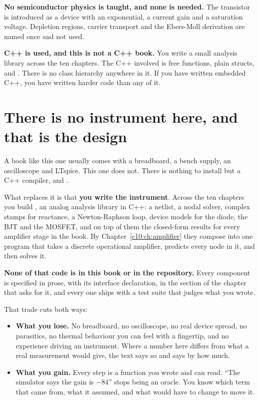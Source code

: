 \textbf{No semiconductor physics is taught, and none is needed.} The transistor is introduced as a
device with an exponential, a current gain and a saturation voltage. Depletion regions, carrier
transport and the Ebers-Moll derivation are named once and not used.

\textbf{C++ is used, and this is not a C++ book.} You write a small analysis library across the
ten chapters. The C++ involved is free functions, plain structs,  and
. There is no class hierarchy anywhere in it. If you have written embedded
C++, you have written harder code than any of it.

\section*{There is no instrument here, and that is the design}
\label{pre:sec:instrument}
A book like this one usually comes with a breadboard, a bench supply, an oscilloscope and LTspice.
This one does not. There is nothing to install but a C++ compiler,  and .

What replaces it is that \textbf{you write the instrument}. Across the ten chapters you build
, an analog analysis library in C++: a netlist, a nodal solver, complex stamps for
reactance, a Newton-Raphson loop, device models for the diode, the BJT and the MOSFET, and on top
of them the closed-form results for every amplifier stage in the book. By Chapter~\ref{c10:ch:amplifier}
they compose into one program that takes a discrete operational amplifier, predicts every node in
it, and then solves it.

\textbf{None of that code is in this book or in the repository.} Every component is specified in
prose, with its interface declaration, in the section of the chapter that asks for it, and every
one ships with a test suite that judges what you wrote.

That trade cuts both ways:
\begin{itemize}
  \item \textbf{What you lose.} No breadboard, no oscilloscope, no real device spread, no
    parasitics, no thermal behaviour you can feel with a fingertip, and no experience driving an
    instrument. Where a number here differs from what a real measurement would give, the text says
    so and says by how much.
  \item \textbf{What you gain.} Every step is a function you wrote and can read. ``The simulator
    says the gain is $-84$'' stops being an oracle. You know which term that came from, what it
    assumed, and what would have to change to move it.
\end{itemize}

